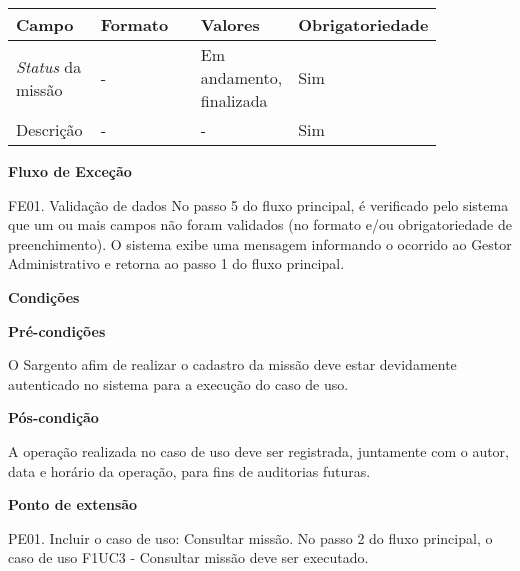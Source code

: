    \begin{table*}[!h]
    \centering
      \begin{tabular}{|p{0.20\linewidth}|p{0.25\linewidth}|p{0.20\linewidth}|p{0.20\linewidth}|}
      \hline
      Campo  & Formato & Valores & Obrigatoriedade\\
      \hline

      \textit{Status} da missão & - & Em andamento, finalizada & Sim\\\hline
      
      Descrição & - & - & Sim\\\hline
      
      \hline
      \end{tabular}
    \end{table*}

   {\raggedright
      \textbf{Fluxo de Exceção}
   }
   
   FE01. Validação de dados
	No passo 5 do fluxo principal, é verificado pelo sistema que um ou mais campos não foram validados (no formato e/ou
	obrigatoriedade de preenchimento). O sistema exibe uma mensagem informando o ocorrido ao Gestor Administrativo e retorna
	ao passo 1 do fluxo principal.

	
   {\raggedright
      \textbf{Condições}
   }
   
    
   \textbf{Pré-condições}
   
   O Sargento afim de realizar o cadastro da missão deve estar devidamente autenticado no sistema para a execução do caso de uso.

   \textbf{Pós-condição}
   
   A operação realizada no caso de uso deve ser registrada, juntamente com o autor, data e horário da operação, para fins de auditorias futuras.
   
   \textbf{Ponto de extensão}
   
   PE01. Incluir o caso de uso: Consultar missão.
   No passo 2 do fluxo principal, o caso de uso F1UC3 - Consultar missão deve ser executado.